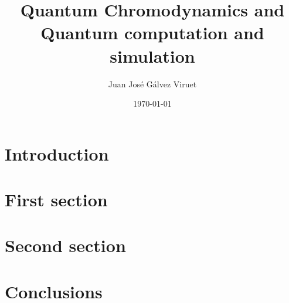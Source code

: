 \documentclass[a4paper,10pt]{article}
\begin{document}
\title{Quantum Chromodynamics and \\ Quantum computation and simulation}
\author{Juan José Gálvez Viruet}
\date{\today}
\maketitle

\begin{abstract}
\noindent \blindtext
\end{abstract}

\begin{multicols}{2}
\section{Introduction} 
 
\blindtext

\blindtext
\section{First section}
\blindtext

\section{Second section}
\blindtext

\blindtext

\section{Conclusions}

\blindtext

\blindtext
\end{multicols}
\end{document}
